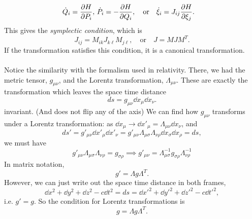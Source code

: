 \documentclass{article}
\begin{document}
        \begin{align*}
            &\dot Q_i = \pdv{H}{P_i}, \, \dot P_i = -\pdv{H}{Q_i}, \quad \mathrm{or} \quad \dot \xi_i = J_{ij} \pdv{H}{\xi_j}.
        \end{align*}
        This gives the \emph{symplectic condition}, which is 
        \begin{equation*}
            J_{ij} =  M_{ik} J_{k\ell} M_{j \ell}, \quad \mathrm{or} \quad J = M J M^T.
        \end{equation*}
        If the transformation satisfies this condition, it is a canonical transformation. \\ \\
        Notice the similarity with the formalism used in relativity. There, we had the metric tensor, $g_{\mu \nu}$, and the Lorentz transformation, $\Lambda_{\mu \nu}$. These are exactly the transformation which leaves the space time distance 
        \begin{equation*}
            ds = g_{\mu \nu} \dd x_\mu \dd x_\nu.
        \end{equation*}
        invariant. (And does not flip any of the axis) We can find how $g_{\mu \nu}$ transforms under a Lorentz transformation: as $\dd x_\mu \rightarrow \dd x'_\mu = \Lambda_{\mu \nu} \dd x_\nu$, and
        \begin{equation*}
            ds' = g'_{\mu \nu} \dd x'_\mu \dd x'_\nu = g'_{\mu \nu} \Lambda_{\mu \sigma} \Lambda_{\nu \rho}\dd x_\sigma \dd x_\rho = ds,
        \end{equation*}
        we must have
        \begin{equation*}
            g'_{\mu \nu} \Lambda_{\mu \sigma} \Lambda_{\nu \rho} = g_{\sigma \rho} \implies g'_{\mu \nu} = \Lambda_{\mu \sigma}^{-1} g_{\sigma \rho} \Lambda_{\nu \rho}^{-1}
        \end{equation*}
        In matrix notation,
        \begin{equation*}
            g' = \Lambda g \Lambda^T.
        \end{equation*}
        However, we can just write out the space time distance in both frames, 
        \begin{equation*}
            \dd x^2 + \dd y^2 + \dd z^2 - c \dd t^2 = ds = \dd x'^2 + \dd y'^2 + \dd z'^2 - c \dd t'^2,
        \end{equation*}
        i.e. $g' = g$. So the condition for Lorentz transformations is 
        \begin{equation*}
            g = \Lambda g \Lambda^T.
        \end{equation*}
        
\end{document}
